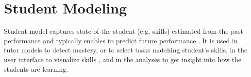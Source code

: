 %



\section{Student Modeling}
\label{sec:student-modeling}

Student model captures state of the student (e.g. skills) estimated from the
past performance and typically enables to predict future performance
\cite{its-learner-models, student-models-review-2012, pelanek-learner-modeling}.
It is used in tutor models to detect mastery, or to select tasks matching
student's skills, in the user interface to visualize skills \cite{instructor-dashboard-realtime},
and in the analyses to get insight into how the students are learning.  %

